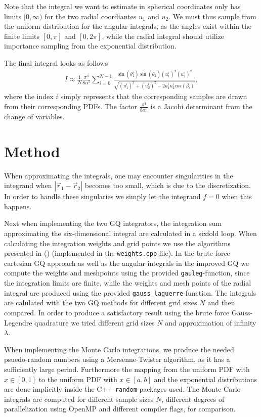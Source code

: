\documentclass[10pt, twocolumn]{aastex62}
\begin{document}
Note that the integral we want to estimate in spherical coordinates
only has limits $[0, \infty)$ for the two radial coordiantes $u_1$ and $u_2$. We
must thus sample from the uniform distribution for the angular integrals, as the
angles exist within the finite limits $[0,\pi]$ and $[0, 2\pi]$, while the radial
integral should utilize importance sampling from the exponential distribution.

The final integral looks as follows
\begin{align}
	I \approx \frac{1}{N}\frac{\pi^4}{8\alpha^5}\sum^{N-1}_{i=0}\frac{\sin
	(\theta_1^i)\sin(\theta_2^i)(u_1^i)^2(u_2^i)^2}{\sqrt{(u_1^i)^2 + (u_2^i)^2 - 2u_1^iu_2^icos(\beta_i)}},
\end{align}
where the index $i$ simply represents that the corresponding samples are drawn
from their corresponding PDFs. The factor $\frac{\pi^4}{8\alpha^5}$ is a Jacobi
determinant from the change of variables.
\section{Method} \label{sec:method}
When approximating the integrals, one may encounter singularities in the
integrand when $|\vec{r}_1 - \vec{r}_2|$ becomes too small, which is due to the
discretization. In order to handle these singularies we simply let the integrand
$f=0$ when this happens. 

Next when implementing the two GQ integrators, the integration sum approximating
the six-dimensional integral are calculated in a sixfold loop. When
calculating the integration weights and grid points we use the algorithms
presented in (\cite{press:2007}) (implemented in the \texttt{weights.cpp}-file).
In the brute force cartesian GQ approach as well as the angular integrals in the
improved GQ we compute the weights and meshpoints using the provided
\texttt{gauleg}-function, since the integration limits are finite, while the weights
and mesh points of the radial integral are produced using the provided
\texttt{gauss\_laguerre}-function. The integrals are calulated with the two GQ
methods for different grid sizes $N$ and then compared. In order to produce a
satisfactory result using the brute force Gauss-Legendre quadrature we tried
different grid sizes $N$ and approximation of infinity $\lambda$.

When implementing the Monte Carlo integrations, we produce the needed
psuedo-random numbers using a Mersenne-Twister algorithm, as it has a
sufficiently large period. Furthermore the mapping from the uniform PDF with
$x\in[0,1]$ to the uniform PDF with $x\in[a,b]$ and the exponential
distributions are done implicitly inside the C++ \texttt{random}-packages used.
The Monte Carlo integrals are computed for different sample sizes $N$,
different degrees of parallelization using OpenMP and different compiler flags,
for comparison. 
\end{document}
